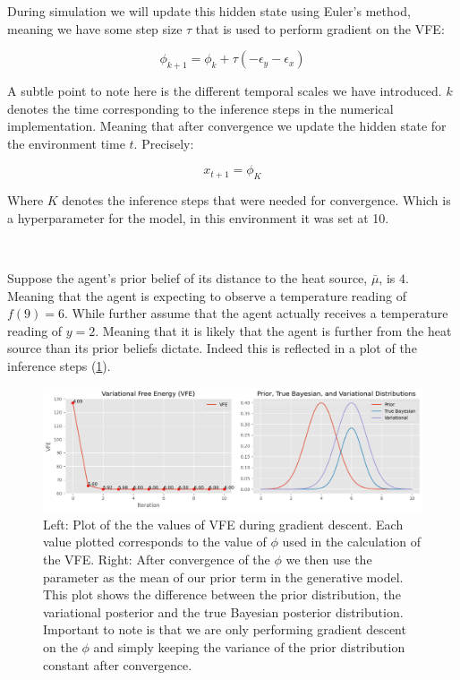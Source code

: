 \documentclass{article}
\newcommand{\refp}[1]{(\ref{#1})}
\begin{document}
During simulation we will update this hidden state using Euler's method, meaning we have some step size $\tau$ that is used to perform gradient on the VFE:

\begin{equation}
	\phi_{k + 1} = \phi_{k} + \tau \left( - \epsilon_y - \epsilon_x \right) 
\end{equation}

A subtle point to note here is the different temporal scales we have introduced. $k$ denotes the time corresponding to the inference steps in the numerical implementation. Meaning that after convergence we update the hidden state for the environment time $t$. Precisely:

\begin{equation}
	x_{t + 1} = \phi_K
\end{equation}

Where $K$ denotes the inference steps that were needed for convergence. Which is a hyperparameter for the model, in this environment it was set at 10.

\

Suppose the agent's prior belief of its distance to the heat source, $\bar{\mu}$, is $4$. Meaning that the agent is expecting to observe a temperature reading of $f(9) = 6$. While further assume that the agent actually receives a temperature reading of $y = 2$. Meaning that it is likely that the agent is further from the heat source than its prior beliefs dictate. Indeed this is reflected in a plot of the inference steps \refp{fig:pc_example_perception}.

\begin{figure}[htbp]
    \centering
    \includegraphics[scale=0.55]{images/pc_example_perception.png}
    \caption{Left: Plot of the the values of VFE during gradient descent. Each value plotted corresponds to the value of $\phi$ used in the calculation of the VFE. Right: After convergence of the $\phi$ we then use the parameter as the mean of our prior term in the generative model. This plot shows the difference between the prior distribution, the variational posterior and the true Bayesian posterior distribution. Important to note is that we are only performing gradient descent on the $\phi$ and simply keeping the variance of the prior distribution constant after convergence.}
    \label{fig:pc_example_perception}
\end{figure}
\end{document}

